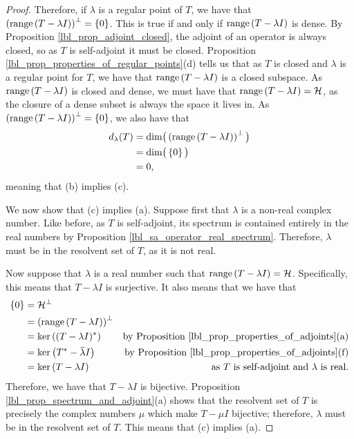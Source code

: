 \begin{proof}
  Therefore, if $\lambda$ is a regular point of $T$, we have that $\left(\operatorname{range}\left(T  - \lambda I\right)\right)^\perp = \left\{0\right\}$. This is true if and only if $\operatorname{range}\left(T - \lambda I\right)$ is dense. By Proposition \eqref{lbl_prop_adjoint_closed}, the adjoint of an operator is always closed, so as $T$ is self-adjoint it must be closed. Proposition \eqref{lbl_prop_properties_of_regular_points}(d) tells us that as $T$ is closed and $\lambda$ is a regular point for $T$, we have that $\operatorname{range}\left(T - \lambda I\right)$ is a closed subspace. As $\operatorname{range}\left(T - \lambda I\right)$ is closed and dense, we must have that $\operatorname{range}\left(T - \lambda I\right) = \mathcal{H}$, as the closure of a dense subset is always the space it lives in. As $\left(\operatorname{range}\left(T - \lambda I\right)\right)^\perp = \left\{0\right\}$, we also have that
  \begin{align*}
      d_\lambda(T)
      &=
      \text{dim} \big( \left(\operatorname{range}\left(T - \lambda I\right)\right)^\perp \big) \\
      &=
      \text{dim}\big(\left\{0\right\}\big) \\
      &=
      0,
  \end{align*}
  meaning that (b) implies (c).

  \medskip

  We now show that (c) implies (a). Suppose first that $\lambda$ is a non-real complex number. Like before, as $T$ is self-adjoint, its spectrum is contained entirely in the real numbers by Proposition \eqref{lbl_sa_operator_real_spectrum}. Therefore, $\lambda$ must be in the resolvent set of $T$, as it is not real.

  \medskip

  Now suppose that $\lambda$ is a real number such that $\operatorname{range}\left(T - \lambda I\right) = \mathcal{H}$. Specifically, this means that $T - \lambda I$ is surjective. It also means that we have that
  \begin{align*}
    \set{0}
    &=
    \HS^\perp \\
    &=
    \left( \range{T - \lambda I} \right)^\perp \\
    &=
    \ker{(T - \lambda I)^*} & \text{by Proposition \eqref{lbl_prop_properties_of_adjoints}(a)} \\
    &=
    \ker{T^* - \conjugate{\lambda}I} & \text{by Proposition \eqref{lbl_prop_properties_of_adjoints}(f)} \\
    &=
    \ker{T - \lambda I} & \text{as $T$ is self-adjoint and $\lambda$ is real.}
  \end{align*}
  Therefore, we have that $T - \lambda I$ is bijective.  Proposition \eqref{lbl_prop_spectrum_and_adjoint}(a) shows that the resolvent set of $T$ is precisely the complex numbers $\mu$ which make $T - \mu I$ bijective; therefore, $\lambda$ must be in the resolvent set of $T$. This means that (c) implies (a).
\end{proof}
